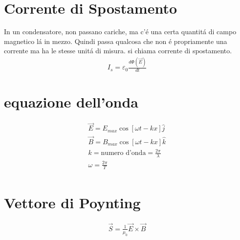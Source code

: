\documentclass{article}
\begin{document}
\section{Corrente di Spostamento}
In un condensatore, non passano cariche, ma c'é una certa quantitá di campo magnetico lá in mezzo. Quindi passa qualcosa che non é propriamente una corrente ma ha le stesse unitá di misura. si chiama corrente di spostamento.
\begin{gather*}
    I_s=\varepsilon_0\frac{d\Phi(\vec{E})}{dt}
\end{gather*}
\section*{equazione dell'onda}
\begin{gather*}
    \vec{E}=E_{max}\cos[\omega t-kx]\hat{j}\\
    \vec{B}=B_{max}\cos[\omega t-kx]\hat{k}\\
    k=\text{numero d'onda}=\frac{2\pi}{\lambda}\\
    \omega=\frac{2\pi}{T}\\
\end{gather*}
\section{Vettore di Poynting}
\begin{gather*}
    \vec{S}=\frac{1}{\mu_0}\vec{E}\times\vec{B}
\end{gather*}
\end{document}
